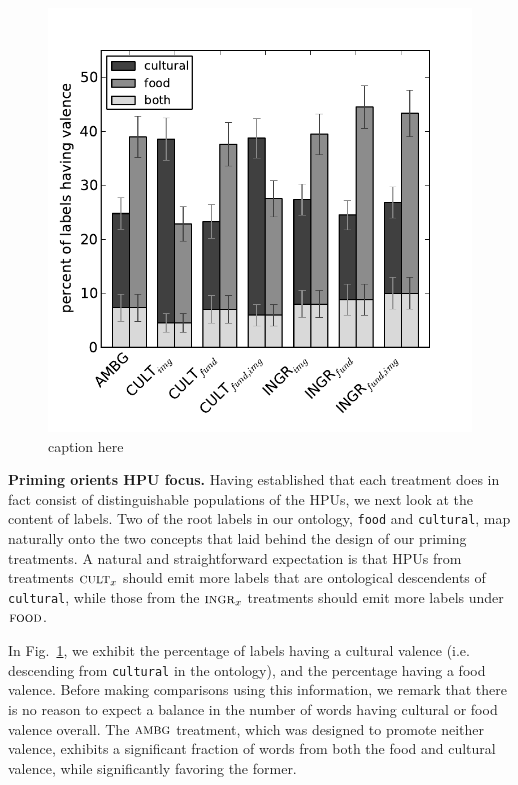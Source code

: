 \documentclass[letterpaper, 11pt, twocolumn]{article}
\begin{document}
\begin{figure}
	\includegraphics[scale=0.65]{../figs/valenceComparison.pdf}
	\caption{caption here}
	\label{fig:valence}
\end{figure}


\textbf{Priming orients HPU focus.}
Having established that each treatment does in fact consist of distinguishable 
populations of the HPUs, we next look at the content of labels.  Two of the
root labels in our ontology, \texttt{food} and \texttt{cultural}, map naturally
onto the two concepts that laid behind the design of our priming treatments.
A natural and straightforward expectation is that HPUs from treatments 
$\textsc{cult}_x$ should emit more labels that are ontological descendents of
\texttt{cultural}, while those from the $\textsc{ingr}_x$ treatments should
emit more labels under $\textsc{food}$.

In Fig.~\ref{fig:valence}, we exhibit the percentage of labels having a 
cultural valence (i.e. descending from \texttt{cultural} in the ontology), and 
the percentage having a food valence. Before making comparisons using this
information, we remark that there is no reason to expect a balance in the 
number of words having cultural or food valence overall.  The $\textsc{ambg}$
treatment, which was designed to promote neither valence, exhibits a
significant fraction of words from both the food and cultural valence, while
significantly favoring the former.  
\end{document}
